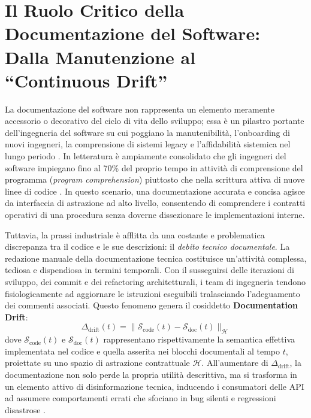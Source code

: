 \section{Il Ruolo Critico della Documentazione del Software: Dalla Manutenzione al ``Continuous Drift''}
\label{sec:intro_ruolo_documentazione}

La documentazione del software non rappresenta un elemento meramente accessorio o decorativo del ciclo di vita dello sviluppo; essa è un pilastro portante dell'ingegneria del software su cui poggiano la manutenibilità, l'onboarding di nuovi ingegneri, la comprensione di sistemi legacy e l'affidabilità sistemica nel lungo periodo \cite{sridhara_towards_2010,rai_review_2022}. In letteratura è ampiamente consolidato che gli ingegneri del software impiegano fino al 70\% del proprio tempo in attività di comprensione del programma (\emph{program comprehension}) piuttosto che nella scrittura attiva di nuove linee di codice \cite{fowkes_autofolding_2017,zhang_survey_2022}. In questo scenario, una documentazione accurata e concisa agisce da interfaccia di astrazione ad alto livello, consentendo di comprendere i contratti operativi di una procedura senza doverne dissezionare le implementazioni interne.

Tuttavia, la prassi industriale è afflitta da una costante e problematica discrepanza tra il codice e le sue descrizioni: il \emph{debito tecnico documentale}. La redazione manuale della documentazione tecnica costituisce un'attività complessa, tediosa e dispendiosa in termini temporali. Con il susseguirsi delle iterazioni di sviluppo, dei commit e dei refactoring architetturali, i team di ingegneria tendono fisiologicamente ad aggiornare le istruzioni eseguibili tralasciando l'adeguamento dei commenti associati. Questo fenomeno genera il cosiddetto \textbf{Documentation Drift}:
\begin{equation}
    \Delta_{\mathrm{drift}}(t) = \|\mathcal{S}_{\mathrm{code}}(t) - \mathcal{S}_{\mathrm{doc}}(t)\|_{\mathcal{H}}
    \label{eq:documentation_drift}
\end{equation}
dove $\mathcal{S}_{\mathrm{code}}(t)$ e $\mathcal{S}_{\mathrm{doc}}(t)$ rappresentano rispettivamente la semantica effettiva implementata nel codice e quella asserita nei blocchi documentali al tempo $t$, proiettate su uno spazio di astrazione contrattuale $\mathcal{H}$. All'aumentare di $\Delta_{\mathrm{drift}}$, la documentazione non solo perde la propria utilità descrittiva, ma si trasforma in un elemento attivo di disinformazione tecnica, inducendo i consumatori delle API ad assumere comportamenti errati che sfociano in bug silenti e regressioni disastrose \cite{luo_repoagent_2024,yang_docagent_2025}.

